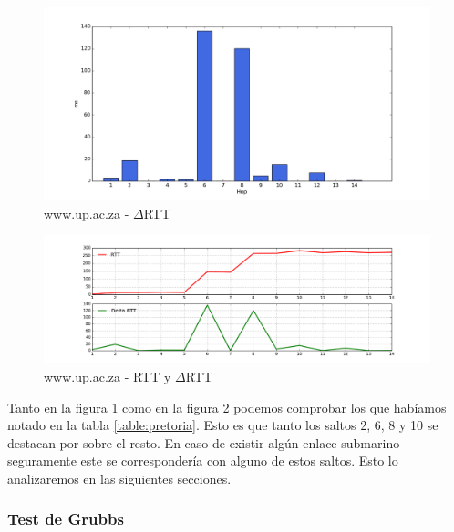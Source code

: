 \begin{figure}[H]
    \begin{center}
        \includegraphics[width=1\textwidth]{data/rtt-pretoria-bar.png}
        \caption{www.up.ac.za - $\Delta$RTT}
        \label{histo:pretoria}
    \end{center}
\end{figure}

\begin{figure}[H]
    \begin{center}
        \includegraphics[width=1\textwidth]{data/rtt-pretoria-lines.png}
        \caption{www.up.ac.za - RTT y $\Delta$RTT}
        \label{lines:pretoria}
    \end{center}
\end{figure}

Tanto en la figura \ref{histo:pretoria} como en la figura \ref{lines:pretoria} podemos comprobar los que habíamos notado en la tabla \ref{table:pretoria}. Esto es que tanto los saltos 2, 6, 8 y 10 se destacan por sobre el resto. En caso de existir algún enlace submarino seguramente este se correspondería con alguno de estos saltos. Esto lo analizaremos en las siguientes secciones.

\subsubsection{Test de Grubbs}\label{pretoria:grubbs}

